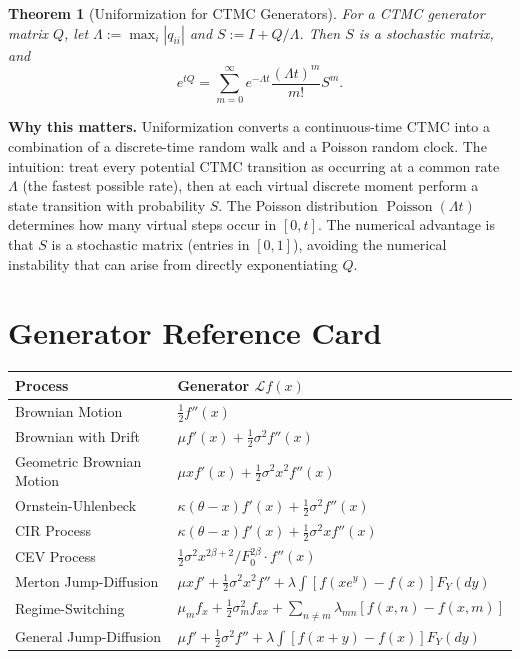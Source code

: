 \documentclass[11pt,a4paper,openany]{book}
\theoremstyle{definition}
\theoremstyle{plain}
\newtheorem{theorem}{Theorem}[chapter]
\theoremstyle{remark}
\newcommand{\1}{\mathbbm{1}}
\newcommand{\calL}{\mathcal{L}}
\begin{document}
\begin{theorem}[Uniformization for CTMC Generators]
For a CTMC generator matrix $Q$, let $\Lambda := \max_{i} |q_{ii}|$ and $S := I + Q/\Lambda$. Then $S$ is a stochastic matrix, and
\[
e^{tQ} = \sum_{m=0}^{\infty} e^{-\Lambda t} \frac{(\Lambda t)^{m}}{m!} S^{m}.
\]
\end{theorem}

\medskip
\noindent\textbf{Why this matters.} Uniformization converts a continuous-time CTMC into a combination of a discrete-time random walk and a Poisson random clock. The intuition: treat every potential CTMC transition as occurring at a common rate $\Lambda$ (the fastest possible rate), then at each virtual discrete moment perform a state transition with probability $S$. The Poisson distribution $\operatorname{Poisson}(\Lambda t)$ determines how many virtual steps occur in $[0,t]$. The numerical advantage is that $S$ is a stochastic matrix (entries in $[0,1]$), avoiding the numerical instability that can arise from directly exponentiating $Q$.

\chapter{Generator Reference Card}

\begin{center}
\begin{tabular}{>{\raggedright\arraybackslash}p{4.5cm}>{\raggedright\arraybackslash}p{7.5cm}}
\toprule
\textbf{Process} & \textbf{Generator $\calL f(x)$} \\
\midrule
Brownian Motion & $\frac{1}{2} f''(x)$ \\
Brownian with Drift & $\mu f'(x) + \frac{1}{2} \sigma^{2} f''(x)$ \\
Geometric Brownian Motion & $\mu x f'(x) + \frac{1}{2} \sigma^{2} x^{2} f''(x)$ \\
Ornstein-Uhlenbeck & $\kappa(\theta - x) f'(x) + \frac{1}{2} \sigma^{2} f''(x)$ \\
CIR Process & $\kappa(\theta - x) f'(x) + \frac{1}{2} \sigma^{2} x f''(x)$ \\
CEV Process & $\frac{1}{2} \sigma^{2} x^{2\beta+2} / F_{0}^{2\beta} \cdot f''(x)$ \\
Merton Jump-Diffusion & $\mu x f' + \frac{1}{2} \sigma^{2} x^{2} f'' + \lambda \int [f(x e^{y}) - f(x)] F_{Y}(dy)$ \\
Regime-Switching & $\mu_{m} f_{x} + \frac{1}{2} \sigma_{m}^{2} f_{xx} + \sum_{n \neq m} \lambda_{mn}[f(x,n) - f(x,m)]$ \\
General Jump-Diffusion & $\mu f' + \frac{1}{2} \sigma^{2} f'' + \lambda \int [f(x+y) - f(x)] F_{Y}(dy)$ \\
\bottomrule
\end{tabular}
\end{center}
\end{document}
